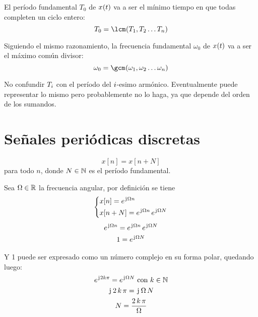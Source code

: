 El período fundamental $T_0$ de $\fx[x]{t}$ va a ser el mínimo tiempo en que todas completen un ciclo entero:
\[
    T_0 = \fx[\lcm]{T_1, T_2 \dots T_\nth}
\]

Siguiendo el mismo razonamiento, la frecuencia fundamental $\omega_0$ de $\fx[x]{t}$ va a ser el máximo común divisor:
\[
    \omega_0 = \fx[\gcm]{\omega_1, \omega_2 \dots \omega_\nth}
\]

No confundir $T_\ith$ con el período del $\ith$-esimo armónico.
Eventualmente puede representar lo mismo pero probablemente no lo haga, ya que depende del orden de los sumandos.

\section{Señales periódicas discretas}

\begin{mdframed}[style=DefinitionFrame]
    \begin{defn}
        \label{defn:funcDiscPeriod}
    \end{defn}
    \begin{equation*}
        x[n] = x[n+N]
    \end{equation*}
    para todo $n$, donde $N \in \setN$ es el período fundamental.
\end{mdframed}

Sea $\Omega \in \setR$ la frecuencia angular, por definición se tiene
\begin{gather*}
    \left\{
    \begin{aligned}
        & x[n] = e^{\iu \Omega n}
        \\
        & x[n+N] = e^{\iu \Omega n} \, e^{\iu \Omega N}
    \end{aligned}
    \right.
    \\[1ex]
    e^{\iu \Omega n} = e^{\iu \Omega n} \, e^{\iu \Omega N}
    \\
    1 = e^{\iu \Omega N}
\end{gather*}

Y 1 puede ser expresado como un número complejo en su forma polar, quedando luego:
\begin{gather*}
    e^{\iu 2 k \pi} = e^{\iu \Omega N} \text{ con $k \in \setN$}
    \\
    \iu \, 2 \, k \, \pi = \iu \, \Omega \, N
    \\
    N = \frac{2 \, k \, \pi}{\Omega}
\end{gather*}

